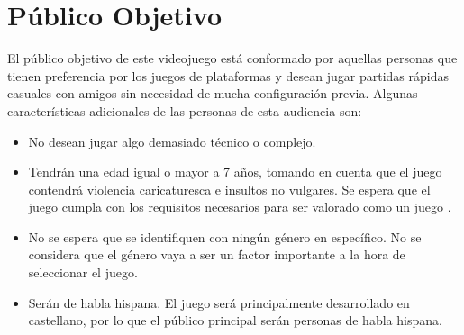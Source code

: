 \section{Público Objetivo}%

El público objetivo de este videojuego está conformado por aquellas personas que
tienen preferencia por los juegos de plataformas y desean jugar partidas rápidas
casuales con amigos sin necesidad de mucha configuración previa. Algunas
características adicionales de las personas de esta audiencia son:

\begin{itemize}
    \item No desean jugar algo demasiado técnico o complejo.
    \item Tendrán una edad igual o mayor a 7 años, tomando en cuenta que el
    juego contendrá violencia caricaturesca e insultos no vulgares. Se espera
    que el juego cumpla con los requisitos necesarios para ser valorado como un
    juego .
    \item No se espera que se identifiquen con ningún género en específico. No
    se considera que el género vaya a ser un factor importante a la hora de
    seleccionar el juego.
    \item Serán de habla hispana. El juego será principalmente desarrollado en
    castellano, por lo que el público principal serán personas de habla hispana.
\end{itemize}